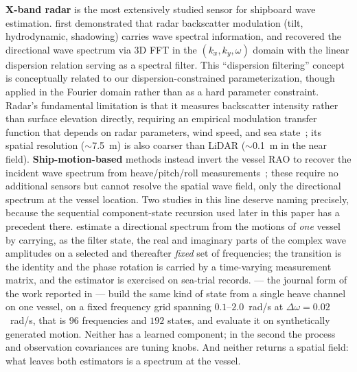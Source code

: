 \documentclass[review]{elsarticle}
\begin{document}
\textbf{X-band radar} is the most extensively studied sensor for
shipboard wave estimation.
\citet{young1985} first demonstrated that radar backscatter
modulation (tilt, hydrodynamic, shadowing) carries wave spectral
information, and \citet{nieto2004} recovered the directional wave
spectrum via 3D FFT in the $(k_x, k_y, \omega)$ domain with the
linear dispersion relation serving as a spectral filter.
This ``dispersion filtering'' concept is conceptually related to
our dispersion-constrained parameterization, though applied in the
Fourier domain rather than as a hard parameter constraint.
Radar's fundamental limitation is that it measures backscatter
intensity rather than surface elevation directly, requiring an
empirical modulation transfer function that depends on radar
parameters, wind speed, and sea state~\citep{nieto2004}; its
spatial resolution ($\sim$7.5~m) is also coarser than LiDAR
($\sim$0.1~m in the near field).
\textbf{Ship-motion-based} methods instead invert the vessel RAO
to recover the incident wave spectrum from heave/pitch/roll
measurements~\citep{naaijen2014, nielsen2006}; these require no
additional sensors but cannot resolve the spatial wave field, only
the directional spectrum at the vessel location.
Two studies in this line deserve naming precisely, because the sequential
component-state recursion used later in this paper has a precedent there.
\citet{Pascoal2017DirSpectra} estimate a directional spectrum from the motions of
\emph{one} vessel by carrying, as the filter state, the real and imaginary parts of
the complex wave amplitudes on a selected and thereafter \emph{fixed} set of
frequencies; the transition is the identity and the phase rotation is carried by a
time-varying measurement matrix, and the estimator is exercised on sea-trial
records. \citet{Kim2019InverseKF} --- the journal form of the work reported in
\citet{Kim2020Thesis} --- build the same kind of state from a single heave channel
on one vessel, on a fixed frequency grid spanning $0.1$--$2.0$~rad/s at
$\Delta\omega = 0.02$~rad/s, that is $96$ frequencies and $192$ states, and evaluate
it on synthetically generated motion. Neither has a learned component; in the second
the process and observation covariances are tuning knobs. And neither returns a
spatial field: what leaves both estimators is a spectrum at the vessel.
\end{document}
